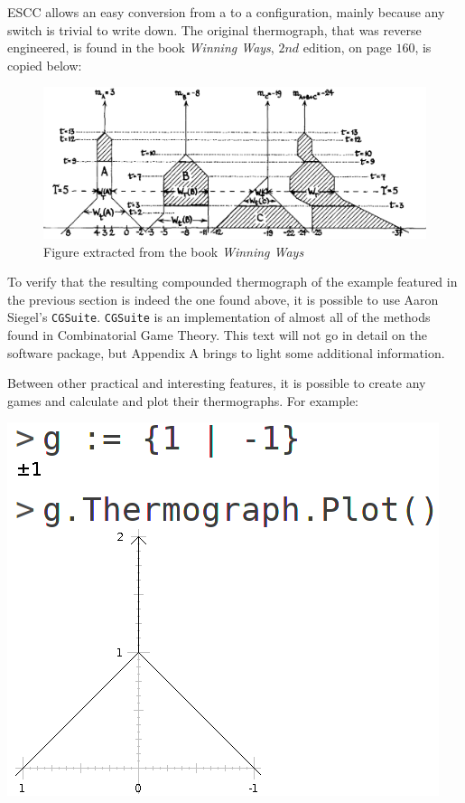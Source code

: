 ESCC allows an easy conversion from a  to a configuration, mainly because any switch is trivial to write down. The original thermograph, that was reverse engineered, is found in the book \textit{Winning Ways}, $2nd$ edition, on page $160$, is copied below:

\vspace{0.5cm}\hspace{-1.5cm}
\begin{figure}[H]
\includegraphics[scale=0.45]{../images/cpd_therm_ww.png}
\caption{Figure extracted from the book \textit{Winning Ways}}
\end{figure}
\vspace{0.5cm}

To verify that the resulting compounded thermograph of the example featured in the previous section is indeed the one found above, it is possible to use Aaron Siegel's \texttt{CGSuite}. \texttt{CGSuite} is an implementation of almost all of the methods found in Combinatorial Game Theory. This text will not go in detail on the software package, but Appendix A brings to light some additional information.

Between other practical and interesting features, it is possible to create any games and calculate and plot their thermographs. For example:

\begin{center}\includegraphics[scale=0.3]{../images/cgsex1.png}\end{center}

